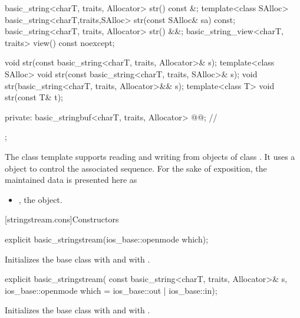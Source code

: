 \begin{codeblock}
{{    basic_string<charT, traits, Allocator> str() const &;
    template<class SAlloc>
      basic_string<charT,traits,SAlloc> str(const SAlloc& sa) const;
    basic_string<charT, traits, Allocator> str() &&;
    basic_string_view<charT, traits> view() const noexcept;

    void str(const basic_string<charT, traits, Allocator>& s);
    template<class SAlloc>
      void str(const basic_string<charT, traits, SAlloc>& s);
    void str(basic_string<charT, traits, Allocator>&& s);
    template<class T>
      void str(const T& t);

  private:
    basic_stringbuf<charT, traits, Allocator> @@;   // \expos
  };
}
\end{codeblock}

\pnum
The
class template
supports reading and writing from objects of class
.
It uses a
object to control the associated sequence.
For the sake of exposition, the maintained data is presented here as
\begin{itemize}
\item
{}, the  object.
\end{itemize}

[stringstream.cons]{Constructors}

%
\begin{itemdecl}
explicit basic_stringstream(ios_base::openmode which);
\end{itemdecl}

\begin{itemdescr}
\pnum
\effects
Initializes the base class with
and
with
.
\end{itemdescr}

%
\begin{itemdecl}
explicit basic_stringstream(
  const basic_string<charT, traits, Allocator>& s,
  ios_base::openmode which = ios_base::out | ios_base::in);
\end{itemdecl}

\begin{itemdescr}
\pnum
\effects
Initializes the base class with
and
with
.
\end{itemdescr}

